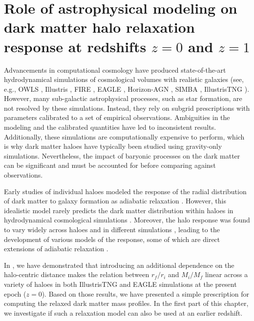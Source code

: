 \chapter[Role of astrophysical modeling and epoch]{Role of astrophysical modeling on dark matter halo relaxation response at redshifts $z=0$ and $z=1$}
\label{chap:physvar_z01}

Advancements in computational cosmology have produced state-of-the-art hydrodynamical simulations of cosmological volumes with realistic galaxies (see, e.g., OWLS \citep{2010MNRAS.402.1536S}, Illustris \citep{2014MNRAS.445..175G}, FIRE \citep{2014MNRAS.445..581H}, EAGLE \citep{2015MNRAS.446..521S}, Horizon-AGN \citep[][]{2017MNRAS.467.4739K}, SIMBA \citep[][]{2019MNRAS.486.2827D}, IllustrisTNG \citep{2019ComAC...6....2N}). However, many sub-galactic astrophysical processes, such as star formation, are not resolved by these simulations. Instead, they rely on subgrid prescriptions with parameters calibrated to a set of empirical observations. Ambiguities in the modeling and the calibrated quantities have led to inconsistent results. Additionally, these simulations are computationally expensive to perform, which is why dark matter haloes have typically been studied using gravity-only simulations. Nevertheless, the impact of baryonic processes on the dark matter can be significant and must be accounted for before comparing against observations.

Early studies of individual haloes modeled the response of the radial distribution of dark matter to galaxy formation as adiabatic relaxation \citep[][]{osti6457593,1984MNRAS.211..753B,1986ApJ...301...27B,1987ApJ...318...15R}. However, this idealistic model rarely predicts the dark matter distribution within haloes in hydrodynamical cosmological simulations \citep[e.g.,][]{2004ApJ...616...16G,2010MNRAS.407..435A}. Moreover, the halo response was found to vary widely across haloes and in different simulations \citep[][]{2004ApJ...616...16G,2006PhRvD..74l3522G,2010MNRAS.402..776P,2010MNRAS.406..922T,2010MNRAS.405.2161D,2010MNRAS.407..435A,2011MNRAS.414..195T,2016MNRAS.461.2658D,2019A&A...622A.197A,2022MNRAS.511.3910F,2023Velmani&Paranjape}, leading to the development of various models of the response, some of which are direct extensions of adiabatic relaxation \citep[e.g.,][]{2004ApJ...616...16G,2006PhRvD..74l3522G,2010MNRAS.407..435A}. ~%

In , we have demonstrated that introducing an additional dependence on the halo-centric distance makes the relation between $r_f/r_i$ and $M_i/M_f$ linear across a variety of haloes in both IllustrisTNG and EAGLE simulations at the present epoch ($z=0$). Based on those results, we have presented a simple prescription for computing the relaxed dark matter mass profiles. In the first part of this chapter, we investigate if such a relaxation model can also be used at an earlier redshift.

